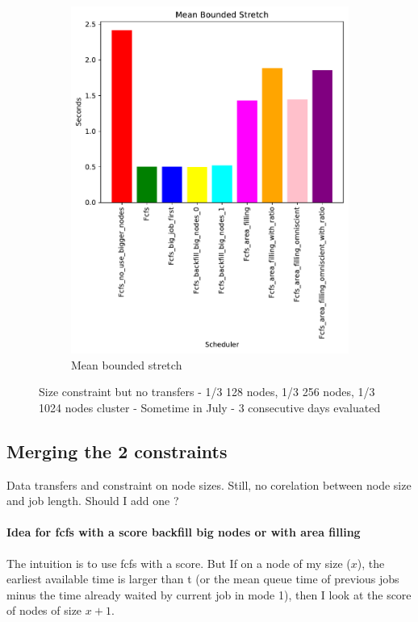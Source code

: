 \documentclass[a4paper]{article}
\begin{document}
\begin{figure}[H]
\begin{subfigure}[b]{0.4\linewidth}\centering\includegraphics[width=1\linewidth]{MBSS/plot/Size_Constraint_2022-01-24->2022-01-26_Mean_Stretch_With_a_Minimum_162_128_162_256_162_1024.pdf}\caption{Mean bounded stretch}\label{28}\end{subfigure}
\caption{Size constraint but no transfers - 1/3 128 nodes, 1/3 256 nodes, 1/3 1024 nodes cluster - Sometime in July - 3 consecutive days evaluated}\label{29}\end{figure}

\subsection{Merging the 2 constraints}

Data transfers and constraint on node sizes. Still, no corelation between node size and job length. Should I add one ?

\paragraph{Idea for fcfs with a score backfill big nodes or with area filling} 
The intuition is to use fcfs with a score. But If on a node of my size ($x$), the earliest available time is larger than t (or the mean queue time of previous jobs minus the time already waited by current job in mode 1), then I look at the score of nodes of size $x+1$.
\end{document}
